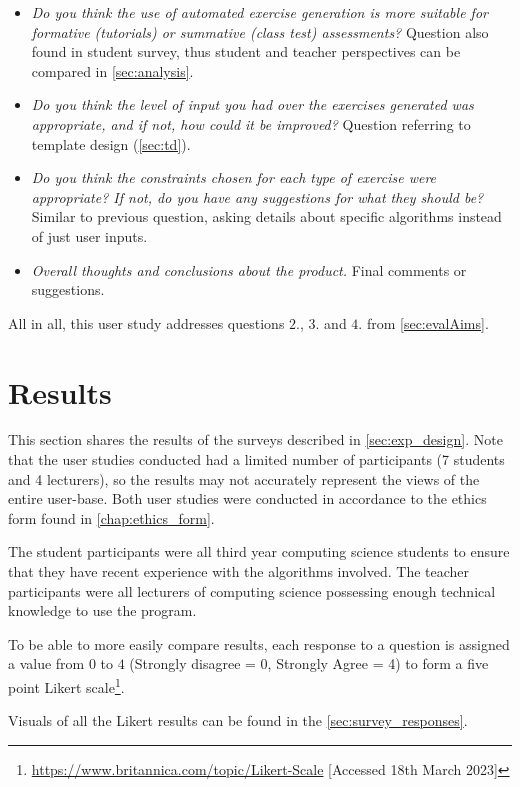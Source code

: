 \documentclass{l4proj}
\begin{document}
\begin{itemize}
	\item
	\emph{Do you think the use of automated exercise generation is more suitable for formative (tutorials) or summative (class test) assessments?} Question also found in student survey, thus student and teacher perspectives can be compared in \autoref{sec:analysis}. 
	\item
	\emph{Do you think the level of input you had over the exercises generated was appropriate, and if not, how could it be improved?} Question referring to template design (\autoref{sec:td}).
	\item
	\emph{Do you think the constraints chosen for each type of exercise were appropriate? If not, do you have any suggestions for what they should be?} Similar to previous question, asking details about specific algorithms instead of just user inputs.
	\item
	\emph{Overall thoughts and conclusions about the product.} Final comments or suggestions.
\end{itemize}

All in all, this user study addresses questions $2.$, $3.$ and $4.$ from \autoref{sec:evalAims}.

\section{Results}
\label{sec:results}

This section shares the results of the surveys described in \autoref{sec:exp_design}. Note that the user studies conducted had a limited number of participants (7 students and 4 lecturers), so the results may not accurately represent the views of the entire user-base. Both user studies were conducted in accordance to the ethics form found in \autoref{chap:ethics_form}.

The student participants were all third year computing science students to ensure that they have recent experience with the algorithms involved. The teacher participants were all lecturers of computing science possessing enough technical knowledge to use the program.

To be able to more easily compare results, each response to a question is assigned a value from $0$ to $4$ (Strongly disagree = 0, Strongly Agree = 4) to form a five point Likert scale\footnote{\url{https://www.britannica.com/topic/Likert-Scale} [Accessed 18th March 2023]}.

Visuals of all the Likert results can be found in the \autoref{sec:survey_responses}.
\end{document}
